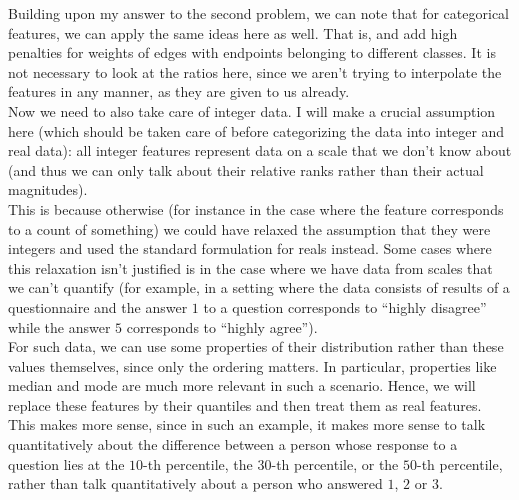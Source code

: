 \documentclass[a4paper]{article}
\newcommand{\nl}{\vspace{0.2cm}\\}
\begin{document}
Building upon my answer to the second problem, we can note that for categorical features, we can apply the same ideas here as well. That is,
and add high penalties for weights of edges with endpoints belonging to different classes. It is not necessary to look at the ratios here, since we aren't trying to interpolate the features in
any manner, as they are given to us already.\nl
Now we need to also take care of integer data. I will make a crucial
assumption here (which should be taken care of before categorizing the data into integer and real data): all integer features represent data on a scale that we don't know about (and thus we can only talk
about their relative ranks rather than their actual magnitudes).\nl
This is because otherwise (for instance in the case where the feature corresponds to a count of something) we could have relaxed the
assumption that they were integers and used the standard formulation for reals instead. Some cases where this relaxation isn't justified is in the case where we have data from scales that
we can't quantify (for example, in a setting where the data consists of results of a questionnaire and the answer $1$ to a question corresponds to ``highly disagree'' while the answer $5$
corresponds to ``highly agree'').\nl
For such data, we can use some properties of their distribution rather than these values themselves, since only the ordering matters. In particular, properties like median and mode are much
more relevant in such a scenario. Hence, we will replace these features by their quantiles and then treat them as real features. This makes more sense, since in such an example, it makes more
sense to talk quantitatively about the difference between a person whose
response to a question lies at the $10$-th percentile, the $30$-th percentile, or the $50$-th percentile, rather than talk quantitatively about a person who answered $1$, $2$ or $3$.\nl

\end{document}
